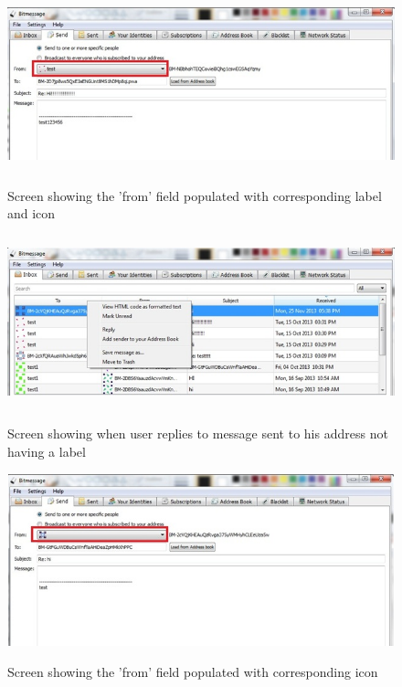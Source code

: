 \documentclass[12pt]{article}
\begin{document}
\begin{figure}[H]
\begin{center}
    {\label{fig:1} \includegraphics[width=12cm,height=5cm]{F2_2.jpg}}   
  \centering  \caption{Screen showing the 'from' field populated with corresponding label and icon}
  \end{center}
\end{figure}

\begin{figure}[H]
\begin{center}
    {\label{fig:1} \includegraphics[width=12cm,height=5cm]{F2_3.jpg}}   
  \centering  \caption{Screen showing when user replies to message sent to his address not having a label}
  \end{center}
\end{figure}

\begin{figure}[H]
\begin{center}
    {\label{fig:1} \includegraphics[width=12cm,height=5cm]{F2_4.jpg}}   
  \centering  \caption{Screen showing the 'from' field populated with corresponding icon}
  \end{center}
\end{figure}
\end{document}
